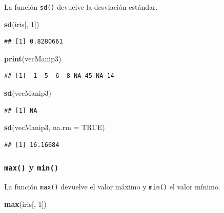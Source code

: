 \documentclass[
]{book}
\newenvironment{Shaded}{\begin{snugshade}}{\end{snugshade}}
\newcommand{\DataTypeTok}[1]{\textcolor[rgb]{0.13,0.29,0.53}{#1}}
\newcommand{\DecValTok}[1]{\textcolor[rgb]{0.00,0.00,0.81}{#1}}
\newcommand{\KeywordTok}[1]{\textcolor[rgb]{0.13,0.29,0.53}{\textbf{#1}}}
\newcommand{\NormalTok}[1]{#1}
\newcommand{\OtherTok}[1]{\textcolor[rgb]{0.56,0.35,0.01}{#1}}
\begin{document}
La función \texttt{sd()} devuelve la desviación estándar.

\begin{Shaded}
\begin{Highlighting}[]
\KeywordTok{sd}\NormalTok{(iris[, }\DecValTok{1}\NormalTok{])}
\end{Highlighting}
\end{Shaded}

\begin{verbatim}
## [1] 0.8280661
\end{verbatim}

\begin{Shaded}
\begin{Highlighting}[]
\KeywordTok{print}\NormalTok{(vecManip3)}
\end{Highlighting}
\end{Shaded}

\begin{verbatim}
## [1]  1  5  6  8 NA 45 NA 14
\end{verbatim}

\begin{Shaded}
\begin{Highlighting}[]
\KeywordTok{sd}\NormalTok{(vecManip3)}
\end{Highlighting}
\end{Shaded}

\begin{verbatim}
## [1] NA
\end{verbatim}

\begin{Shaded}
\begin{Highlighting}[]
\KeywordTok{sd}\NormalTok{(vecManip3, }\DataTypeTok{na.rm =} \OtherTok{TRUE}\NormalTok{)}
\end{Highlighting}
\end{Shaded}

\begin{verbatim}
## [1] 16.16684
\end{verbatim}

\hypertarget{l015max}{%
\subsubsection{\texorpdfstring{\texttt{max()} y \texttt{min()}}{max() y min()}}\label{l015max}}

La función \texttt{max()} devuelve el valor máximo y \texttt{min()} el valor mínimo.

\begin{Shaded}
\begin{Highlighting}[]
\KeywordTok{max}\NormalTok{(iris[, }\DecValTok{1}\NormalTok{])}
\end{Highlighting}
\end{Shaded}
\end{document}
